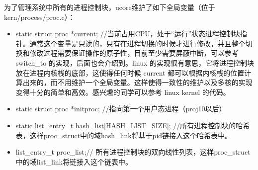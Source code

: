 为了管理系统中所有的进程控制块，ucore维护了如下全局变量（位于kern/process/proc.c）：

\begin{itemize}
\tightlist
\item
  static struct proc *current;
  //当前占用CPU，处于``运行''状态进程控制块指针。通常这个变量是只读的，只有在进程切换的时候才进行修改，并且整个切换和修改过程需要保证操作的原子性，目前至少需要屏蔽中断，可以参考
  switch\_to 的实现，后面也会介绍到。linux
  的实现很有意思，它将进程控制块放在进程内核桟的底部，这使得任何时候
  current
  都可以根据内核桟的位置计算出来的，而不用维护一个全局变量。这样使得一致性的维护以及多核的实现变得十分的简单和高效。感兴趣的同学可以参考
  linux kernel 的代码。
\item
  static struct proc *initproc; //指向第一个用户态进程（proj10以后）
\item
  static list\_entry\_t hash\_list{[}HASH\_LIST\_SIZE{]};
  //所有进程控制块的哈希表，这样proc\_struct中的域hash\_link将基于pid链接入这个哈希表中。
\item
  list\_entry\_t proc\_list;//
  所有进程控制块的双向线性列表，这样proc\_struct中的域list\_link将链接入这个链表中。
\end{itemize}
